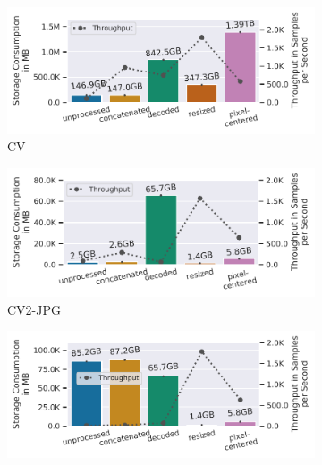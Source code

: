{\vspace{-0.1cm}
\begin{figure}[h]
    \begin{subfigure}[c]{0.22\textwidth}
        \includegraphics[width=\textwidth]{figures/imagenet-pipeline/storage-vs-throughput.pdf}
        \vspace{-18pt}
        \caption{CV}
        \label{fig:ss-vs-thr-cv}
    \end{subfigure}
    \begin{subfigure}[c]{0.22\textwidth}
        \includegraphics[width=\textwidth]{figures/cubeplusplus-jpg-pipeline/storage-vs-throughput.pdf}
        \vspace{-18pt}
        \caption{CV2-JPG}
        \label{fig:ss-vs-thr-cv2-jpg}
    \end{subfigure}
    \begin{subfigure}[c]{0.22\textwidth}
        \includegraphics[width=\textwidth]{figures/cubeplusplus-png-pipeline/storage-vs-throughput.pdf}

\end{subfigure}
\end{figure}}
